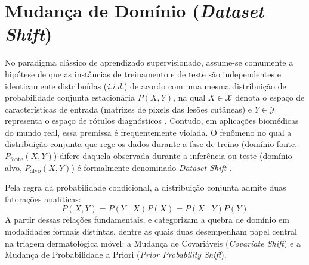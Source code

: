 \documentclass[oneside,english,brazilian]{UNISINOSmonografia}
\begin{document}
\section{Mudança de Domínio (\textit{Dataset Shift})}

No paradigma clássico de aprendizado supervisionado, assume-se comumente a hipótese de que as instâncias de treinamento e de teste são independentes e identicamente distribuídas (\textit{i.i.d.}) de acordo com uma mesma distribuição de probabilidade conjunta estacionária $P(X, Y)$, na qual $X \in \mathcal{X}$ denota o espaço de características de entrada (matrizes de pixels das lesões cutâneas) e $Y \in \mathcal{Y}$ representa o espaço de rótulos diagnósticos \cite{quionero2009dataset}. Contudo, em aplicações biomédicas do mundo real, essa premissa é frequentemente violada. O fenômeno no qual a distribuição conjunta que rege os dados durante a fase de treino (domínio fonte, $P_{\text{fonte}}(X, Y)$) difere daquela observada durante a inferência ou teste (domínio alvo, $P_{\text{alvo}}(X, Y)$) é formalmente denominado \textit{Dataset Shift} \cite{quionero2009dataset, morenotorres2012unifying}.

Pela regra da probabilidade condicional, a distribuição conjunta admite duas fatorações analíticas:
\begin{equation}
    P(X, Y) = P(Y \mid X) P(X) = P(X \mid Y) P(Y)
\end{equation}
A partir dessas relações fundamentais,  e  categorizam a quebra de domínio em modalidades formais distintas, dentre as quais duas desempenham papel central na triagem dermatológica móvel: a Mudança de Covariáveis (\textit{Covariate Shift}) e a Mudança de Probabilidade a Priori (\textit{Prior Probability Shift}).
\end{document}
